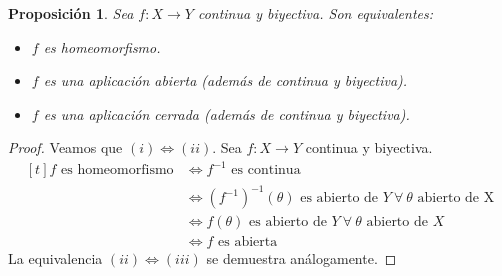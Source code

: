 \documentclass[12pt]{report}
\newtheorem{proposition}{Proposición}[chapter]
\theoremstyle{definition}
\theoremstyle{definition}
\theoremstyle{remark}
\begin{document}
\begin{proposition}
\label{prop1.17.}
Sea $f \colon X \to Y$ continua y biyectiva. Son equivalentes:
\begin{itemize}
    \item[(i)] $f$ es homeomorfismo.
    \item[(ii)] $f$ es una aplicación abierta (además de continua y biyectiva).
    \item[(iii)] $f$ es una aplicación cerrada (además de continua y biyectiva).
\end{itemize}
\end{proposition}

\begin{proof}
Veamos que $(i) \iff (ii)$. Sea $f \colon X \to Y$ continua y biyectiva.
\[
    \begin{aligned}[t]
        f \textrm{ es homeomorfismo} &\iff f^{-1} \textrm{ es continua} \\
        &\iff (f^{-1})^{-1}(\theta) \textrm{ es abierto de } Y \ \forall \ \theta \textrm{ abierto de X} \\
        &\iff f(\theta) \textrm{ es abierto de } Y \ \forall \ \theta \textrm{ abierto de } X \\
        &\iff f \textrm{ es abierta}
    \end{aligned}
\]
La equivalencia $(ii) \iff (iii)$ se demuestra análogamente.
\end{proof}
\end{document}
